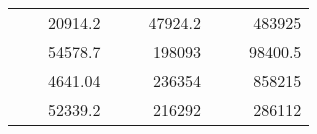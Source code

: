 \begin{table}[H]
\begin{tabular}{|ccrccrccc}
\rowcolor[HTML]{DDFDFF} 
\multicolumn{1}{|c|}{\cellcolor[HTML]{FFFFC7}}                                & \multicolumn{1}{c|}{\cellcolor[HTML]{DDFDFF}}                      & \multicolumn{1}{r|}{\cellcolor[HTML]{DAE8FC}20914.2}   & \multicolumn{1}{c|}{\cellcolor[HTML]{FFFFC7}}                                & \multicolumn{1}{c|}{\cellcolor[HTML]{DDFDFF}}                       & \multicolumn{1}{r|}{\cellcolor[HTML]{DDFDFF}47924.2}   & \multicolumn{1}{c|}{\cellcolor[HTML]{FFFFC7}}                                & \multicolumn{1}{c|}{\cellcolor[HTML]{DDFDFF}}                      & \multicolumn{1}{r|}{\cellcolor[HTML]{DDFDFF}483925}    \\ \cline{3-3} \cline{6-6} \cline{9-9} 
\multicolumn{1}{|c|}{\cellcolor[HTML]{FFFFC7}}                                & \multicolumn{1}{c|}{\cellcolor[HTML]{DDFDFF}}                      & \multicolumn{1}{r|}{\cellcolor[HTML]{DDFDFF}54578.7}   & \multicolumn{1}{c|}{\cellcolor[HTML]{FFFFC7}}                                & \multicolumn{1}{c|}{\cellcolor[HTML]{DDFDFF}}                       & \multicolumn{1}{r|}{\cellcolor[HTML]{DAE8FC}198093}    & \multicolumn{1}{c|}{\cellcolor[HTML]{FFFFC7}}                                & \multicolumn{1}{c|}{\cellcolor[HTML]{DDFDFF}}                      & \multicolumn{1}{r|}{\cellcolor[HTML]{DAE8FC}98400.5}   \\ \cline{3-3} \cline{6-6} \cline{9-9} 
\rowcolor[HTML]{DDFDFF} 
\multicolumn{1}{|c|}{\cellcolor[HTML]{FFFFC7}}                                & \multicolumn{1}{c|}{\cellcolor[HTML]{DDFDFF}}                      & \multicolumn{1}{r|}{\cellcolor[HTML]{DAE8FC}4641.04}   & \multicolumn{1}{c|}{\cellcolor[HTML]{FFFFC7}}                                & \multicolumn{1}{c|}{\cellcolor[HTML]{DDFDFF}}                       & \multicolumn{1}{r|}{\cellcolor[HTML]{DDFDFF}236354}    & \multicolumn{1}{c|}{\cellcolor[HTML]{FFFFC7}}                                & \multicolumn{1}{c|}{\cellcolor[HTML]{DDFDFF}}                      & \multicolumn{1}{r|}{\cellcolor[HTML]{DDFDFF}858215}    \\ \cline{3-3} \cline{6-6} \cline{9-9} 
\multicolumn{1}{|c|}{\cellcolor[HTML]{FFFFC7}}                                & \multicolumn{1}{c|}{\cellcolor[HTML]{DDFDFF}}                      & \multicolumn{1}{r|}{\cellcolor[HTML]{DDFDFF}52339.2}   & \multicolumn{1}{c|}{\cellcolor[HTML]{FFFFC7}}                                & \multicolumn{1}{c|}{\cellcolor[HTML]{DDFDFF}}                       & \multicolumn{1}{r|}{\cellcolor[HTML]{DAE8FC}216292}    & \multicolumn{1}{c|}{\cellcolor[HTML]{FFFFC7}}                                & \multicolumn{1}{c|}{\cellcolor[HTML]{DDFDFF}}                      & \multicolumn{1}{r|}{\cellcolor[HTML]{DAE8FC}286112}    \\ \cline{3-3} \cline{6-6} \cline{9-9} 

\end{tabular}
\end{table}
